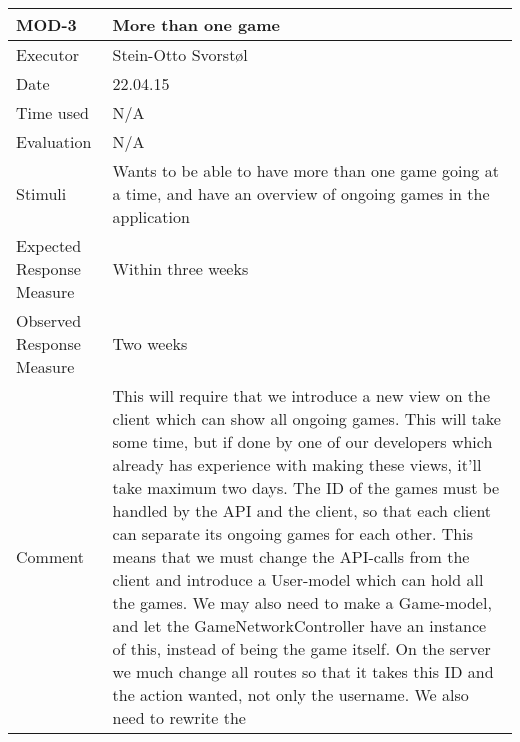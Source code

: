 \begin{table}[H]
\begin{tabular}{|l|p{10cm}|}
\hline
\textbf{MOD-3} & More than one game \\ \hline
Executor    & Stein-Otto Svorstøl             \\ \hline
Date        & 22.04.15         \\ \hline
Time used   & N/A    \\ \hline
Evaluation  & N/A      \\ \hline
Stimuli     & Wants to be able to have more than one game going at a time, and have an overview of ongoing games in the application        \\ \hline
Expected Response Measure &  Within three weeks     \\ \hline
Observed Response Measure &  Two weeks       \\ \hline
Comment     &  This will require that we introduce a new view on the client which can show all ongoing games. This will take some time, but if done by one of our developers which already has experience with making these views, it'll take maximum two days. The ID of the games must be handled by the API and the client, so that each client can separate its ongoing games for each other. This means that we must change the API-calls from the client and introduce a User-model which can hold all the games. We may also need to make a Game-model, and let the GameNetworkController have an instance of this, instead of being the game itself. On the server we much change all routes so that it takes this ID and the action wanted, not only the username. We also need to rewrite the        \\ \hline
\end{tabular}
\end{table}

